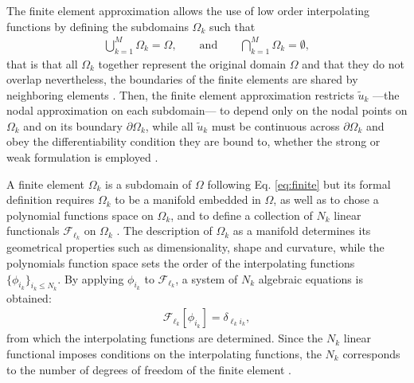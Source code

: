 
%
%
%
The finite element approximation allows the use of low order interpolating functions by defining the subdomains $\Omega_k$ such that
%
\begin{align}
    \bigcup_{k=1}^M \Omega_k = \Omega,
        \qquad
        \text{and}
        \qquad
    \bigcap_{k=1}^M \Omega_k = \emptyset,
\label{eq:finite}
\end{align}
%
that is that all $\Omega_k$ together represent the original domain $\Omega$ and that they do not overlap nevertheless, the boundaries of the finite elements are shared by neighboring elements \cite{dhatt_finite_2012}. Then, the finite element approximation restricts  $\tilde{u}_k$  ---the nodal approximation  on each subdomain--- to depend only on the nodal points on $\Omega_k$ and on its boundary $\partial\Omega_k$, while all $\tilde{u}_k$ must be continuous across $\partial \Omega_k$ and obey the  differentiability condition they are bound to, whether the strong or weak formulation is employed \cite{dhatt_finite_2012}.

%
%
A finite element $\Omega_k$ is a subdomain of $\Omega$ following Eq. \eqref{eq:finite} but its formal definition requires $\Omega_k$ to be a manifold embedded in $\Omega$, as well as to chose a polynomial functions space on $\Omega_k$, and to define a collection of $N_k$ linear functionals $\mathcal{F}_{\ell_k}$ on $\Omega_k$ \cite{larson_finite_2013}. The description of $\Omega_k$ as a manifold determines its geometrical properties such as dimensionality, shape and curvature, while the polynomials function space sets the order of the interpolating functions $\{\phi_{i_k}\}_{i_k\leq N_k}$. By applying $\phi_{i_k}$ to  $\mathcal{F}_{\ell_k}$, a system of $N_k$ algebraic  equations is obtained:
%
\begin{align}
    \mathcal{F}_{\ell_k}[\phi_{i_k}] = \delta_{{\ell_k} {i_k}},
    \label{eq:linfunc}
\end{align}
%
from which the interpolating functions are determined. Since the $N_k$ linear functional imposes conditions on the interpolating functions, the $N_k$ corresponds to the number of degrees of freedom of the finite element \cite{larson_finite_2013}.

